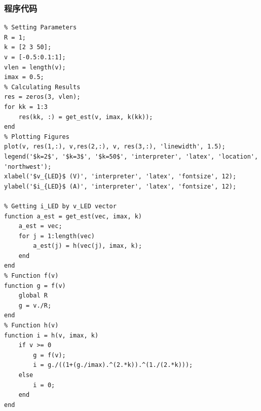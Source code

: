 \documentclass[11pt]{article}
\begin{document}
\subsubsection*{程序代码}
\begin{lstlisting}
% Setting Parameters
R = 1;
k = [2 3 50];
v = [-0.5:0.1:1];
vlen = length(v);
imax = 0.5;
% Calculating Results
res = zeros(3, vlen);
for kk = 1:3
    res(kk, :) = get_est(v, imax, k(kk));
end
% Plotting Figures
plot(v, res(1,:), v,res(2,:), v, res(3,:), 'linewidth', 1.5);
legend('$k=2$', '$k=3$', '$k=50$', 'interpreter', 'latex', 'location', 'northwest');
xlabel('$v_{LED}$ (V)', 'interpreter', 'latex', 'fontsize', 12);
ylabel('$i_{LED}$ (A)', 'interpreter', 'latex', 'fontsize', 12);

% Getting i_LED by v_LED vector
function a_est = get_est(vec, imax, k)
    a_est = vec;
    for j = 1:length(vec)
        a_est(j) = h(vec(j), imax, k);
    end
end
% Function f(v)
function g = f(v)
    global R
    g = v./R;
end
% Function h(v)
function i = h(v, imax, k)
    if v >= 0
        g = f(v);
        i = g./((1+(g./imax).^(2.*k)).^(1./(2.*k)));
    else
        i = 0;
    end
end
\end{lstlisting}
\end{document}

